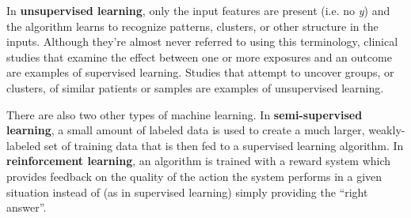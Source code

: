 In \textbf{unsupervised learning}, only the input features are present (i.e. no \emph{y}) and the algorithm learns to recognize patterns, clusters, or other structure in the inputs. Although they're almost never referred to using this terminology, clinical studies that examine the effect between one or more exposures and an outcome are examples of supervised learning. Studies that attempt to uncover groups, or clusters, of similar patients or samples are examples of unsupervised learning.

There are also two other types of machine learning. In \textbf{semi-supervised learning}, a small amount of labeled data is used to create a much larger, weakly-labeled set of training data that is then fed to a supervised learning algorithm. In \textbf{reinforcement learning}, an algorithm is trained with a reward system which provides feedback on the quality of the action the system performs in a given situation instead of (as in supervised learning) simply providing the ``right answer''. 





 

